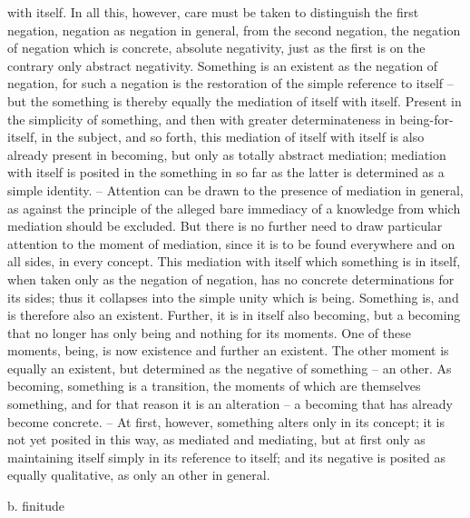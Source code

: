 with itself. In all this, however, care must be taken to distinguish the first
negation, negation as negation in general, from the second negation, the
negation of negation which is concrete, absolute negativity, just as the first
is on the contrary only abstract negativity.
Something is an existent as the negation of negation, for such a negation
is the restoration of the simple reference to itself – but the something is
thereby equally the mediation of itself with itself. Present in the simplicity
of something, and then with greater determinateness in being-for-itself, in
the subject, and so forth, this mediation of itself with itself is also already
present in becoming, but only as totally abstract mediation; mediation
with itself is posited in the something in so far as the latter is determined as
a simple identity. – Attention can be drawn to the presence of mediation
in general, as against the principle of the alleged bare immediacy of a
knowledge from which mediation should be excluded. But there is no
further need to draw particular attention to the moment of mediation,
since it is to be found everywhere and on all sides, in every concept.
This mediation with itself which something is in itself, when taken only
as the negation of negation, has no concrete determinations for its sides;
thus it collapses into the simple unity which is being. Something is, and
is therefore also an existent. Further, it is in itself also becoming, but a
becoming that no longer has only being and nothing for its moments.
One of these moments, being, is now existence and further an existent.
The other moment is equally an existent, but determined as the negative of
something – an other. As becoming, something is a transition, the moments
of which are themselves something, and for that reason it is an alteration – a
becoming that has already become concrete. – At first, however, something
alters only in its concept; it is not yet posited in this way, as mediated and
mediating, but at first only as maintaining itself simply in its reference to
itself; and its negative is posited as equally qualitative, as only an other in
general.

b. finitude

